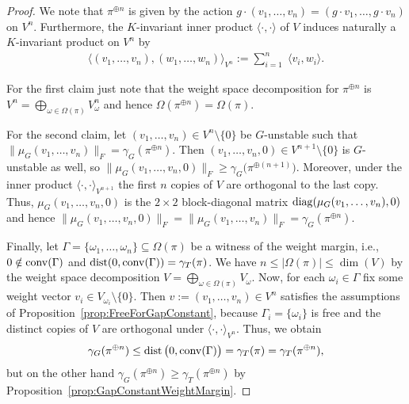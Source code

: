 \begin{proof}
	We note that $\pi^{\oplus n}$ is given by the action $g \cdot (v_1,\ldots,v_n) = (g \cdot v_1 , \ldots, g \cdot v_n)$ on $V^n$. Furthermore, the $K$-invariant inner product $\langle \cdot, \cdot \rangle$ of $V$ induces naturally a $K$-invariant product on $V^n$ by
	\begin{align*}
		\langle (v_1,\ldots,v_n), (w_1,\ldots,w_n) \rangle_{V^n} := \sum_{i=1}^n \; \langle v_i, w_i \rangle.
	\end{align*}
	
	For the first claim just note that the weight space decomposition for $\pi^{\oplus n}$ is $V^n = \bigoplus_{\omega \in \Omega(\pi)} V_{\omega}^n$ and hence $\Omega(\pi^{\oplus n}) = \Omega(\pi)$.
	
	For the second claim, let $(v_1,\ldots,v_n) \in V^n \setminus \{0\}$ be $G$-unstable such that $\| \mu_G(v_1,\ldots,v_n) \|_F = \gamma_G(\pi^{\oplus n})$. Then $(v_1,\ldots,v_n,0) \in V^{n+1} \setminus \{0\}$ is $G$-unstable as well, so $\| \mu_G(v_1,\ldots,v_n,0) \|_F \geq \gamma_{G} \big( \pi^{\oplus(n+1)} \big)$. Moreover, under the inner product $\langle \cdot, \cdot \rangle_{V^{n+1}}$ the first $n$ copies of $V$ are orthogonal to the last copy. Thus, $\mu_{G}(v_1,\ldots,v_n,0)$ is the $2 \times 2$ block-diagonal matrix $\operatorname{diag}(\mu_G(v_1,\ldots,v_n),0)$ and hence $\| \mu_G(v_1,\ldots,v_n,0) \|_F = \| \mu_G(v_1,\ldots,v_n) \|_F =  \gamma_G(\pi^{\oplus n})$.
	
	Finally, let $\Gamma = \{ \omega_1,\ldots,\omega_n \} \subseteq \Omega(\pi)$ be a witness of the weight margin, i.e., $0 \notin \operatorname{conv}(\Gamma)$ and $\operatorname{dist}(0, \operatorname{conv}(\Gamma)) = \gamma_{T}(\pi)$. We have $n \leq \vert \Omega(\pi)\vert \leq \dim(V)$ by the weight space decomposition $V = \bigoplus_{\omega \in \Omega(\pi)} V_{\omega}$. %
	Now, for each $\omega_i \in \Gamma$ fix some weight vector $v_i \in V_{\omega_i} \setminus \{0\}$. Then $v := (v_1,\ldots,v_n) \in V^n$ satisfies the assumptions of Proposition~\ref{prop:FreeForGapConstant}, because $\Gamma_i = \lbrace \omega_i \rbrace$ is free and the distinct copies of $V$ are orthogonal under $\langle \cdot, \cdot \rangle_{V^n}$. Thus, we obtain
	\begin{align*}
		\gamma_G(\pi^{\oplus n}) \leq \operatorname{dist} \big( 0, \operatorname{conv}(\Gamma) \big) = \gamma_{T}(\pi) = \gamma_{T}(\pi^{\oplus n}),
	\end{align*}
	but on the other hand $\gamma_G(\pi^{\oplus n}) \geq \gamma_{T}(\pi^{\oplus n})$ by Proposition~\ref{prop:GapConstantWeightMargin}.
\end{proof}





